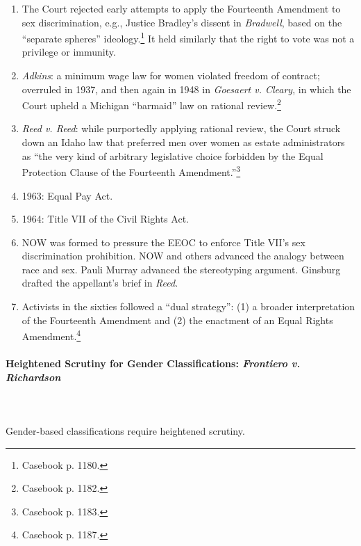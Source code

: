 \begin{enumerate}
    \item The Court rejected early attempts to apply the Fourteenth Amendment 
    to sex discrimination, e.g., Justice Bradley's dissent in \emph{Bradwell}, 
    based on the ``separate spheres'' ideology.\footnote{Casebook p. 1180.} It 
    held similarly that the right to vote was not a privilege or immunity.
    \item \emph{Adkins}: a minimum wage law for women violated freedom of 
    contract; overruled in 1937, and then again in 1948 in \emph{Goesaert v. 
    Cleary}, in which the Court upheld a Michigan ``barmaid'' law on rational 
    review.\footnote{Casebook p. 1182.}
    \item \emph{Reed v. Reed}: while purportedly applying rational review, the 
    Court struck down an Idaho law that preferred men over women as estate 
    administrators as ``the very kind of arbitrary legislative choice 
    forbidden by the Equal Protection Clause of the Fourteenth 
    Amendment.''\footnote{Casebook p. 1183.}
    \item 1963: Equal Pay Act.
    \item 1964: Title VII of the Civil Rights Act.
    \item NOW was formed to pressure the EEOC to enforce Title VII's sex 
    discrimination prohibition. NOW and others advanced the analogy between 
    race and sex. Pauli Murray advanced the stereotyping argument. Ginsburg 
    drafted the appellant's brief in \emph{Reed}.
    \item Activists in the sixties followed a ``dual strategy'': (1) a broader 
    interpretation of the Fourteenth Amendment and (2) the enactment of an 
    Equal Rights Amendment.\footnote{Casebook p. 1187.}
\end{enumerate}

\paragraph{Heightened Scrutiny for Gender Classifications: \emph{Frontiero v. 
Richardson}}
~\\\\
Gender-based classifications require heightened scrutiny.

